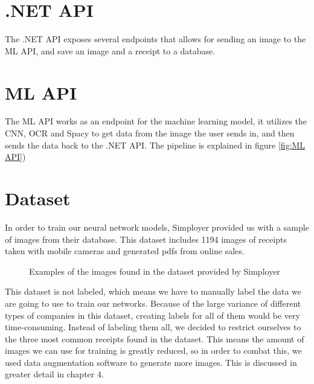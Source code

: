\section{.NET API}\label{sec:.NET API}
The .NET API exposes several endpoints that allows for sending an image to the ML API, and save an image and a receipt to a database.

\section{ML API}\label{sec:ML API}
The ML API works as an endpoint for the machine learning model, it utilizes the CNN, OCR and Spacy to get data from
the image the user sends in, and then sends the data back to the .NET API\@.
The pipeline is explained in figure \ref{fig:ML API})

\section{Dataset}\label{sec:dataset}
In order to train our neural network models, Simployer provided us with a sample of images from their database.
This dataset includes 1194 images of receipts taken with mobile cameras and generated pdfs from online sales.

\begin{figure}[h]
    \caption{Examples of the images found in the dataset provided by Simployer}
    \label{fig:figure3.2}
\end{figure}

This dataset is not labeled, which means we have to manually label the data we are going to use to train our networks.
Because of the large variance of different types of companies in this dataset, creating labels for all of them would be very time-consuming.
Instead of labeling them all, we decided to restrict ourselves to the three most common receipts found in the dataset.
This means the amount of images we can use for training is greatly reduced, so in order to combat this, we used data augmentation software to generate more images.
This is discussed in greater detail in chapter 4.

